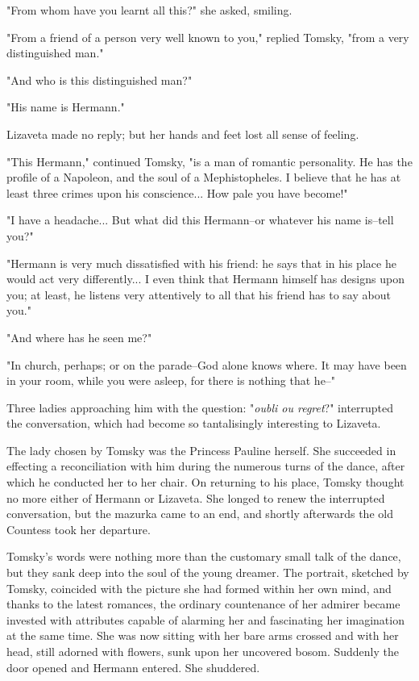 "From whom have you learnt all this?" she asked, smiling.

"From a friend of a person very well known to you," replied Tomsky,
"from a very distinguished man."

"And who is this distinguished man?"

"His name is Hermann."

Lizaveta made no reply; but her hands and feet lost all sense of
feeling.

"This Hermann," continued Tomsky, "is a man of romantic personality.
He has the profile of a Napoleon, and the soul of a Mephistopheles. I
believe that he has at least three crimes upon his conscience... How
pale you have become!"

"I have a headache... But what did this Hermann--or whatever his name
is--tell you?"

"Hermann is very much dissatisfied with his friend: he says that in
his place he would act very differently... I even think that Hermann
himself has designs upon you; at least, he listens very attentively to
all that his friend has to say about you."

"And where has he seen me?"

"In church, perhaps; or on the parade--God alone knows where. It may
have been in your room, while you were asleep, for there is nothing
that he--"

Three ladies approaching him with the question: "\emph{oubli ou regret}?"
interrupted the conversation, which had become so tantalisingly
interesting to Lizaveta.

The lady chosen by Tomsky was the Princess Pauline herself. She
succeeded in effecting a reconciliation with him during the numerous
turns of the dance, after which he conducted her to her chair. On
returning to his place, Tomsky thought no more either of Hermann or
Lizaveta. She longed to renew the interrupted conversation, but the
mazurka came to an end, and shortly afterwards the old Countess took
her departure.

Tomsky's words were nothing more than the customary small talk of the
dance, but they sank deep into the soul of the young dreamer. The
portrait, sketched by Tomsky, coincided with the picture she had
formed within her own mind, and thanks to the latest romances, the
ordinary countenance of her admirer became invested with attributes
capable of alarming her and fascinating her imagination at the same
time. She was now sitting with her bare arms crossed and with her
head, still adorned with flowers, sunk upon her uncovered bosom.
Suddenly the door opened and Hermann entered. She shuddered.

